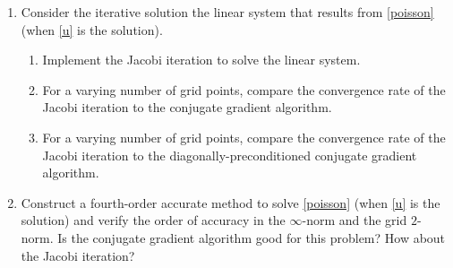\documentclass[10pt]{amsart}
\begin{document}
\begin{enumerate}[label={\bf Problem~{\arabic*}:}]
  \mline 
  \item Consider the iterative solution the linear system that results
    from \eqref{poisson} (when \eqref{u} is the solution).
    \begin{enumerate}
    \item Implement the Jacobi iteration to solve the linear system.
    \item For a varying number of grid points, compare the convergence rate of the Jacobi iteration to the
      conjugate gradient algorithm.
      \item For a varying number of grid points, compare the convergence rate of the Jacobi iteration to
        the diagonally-preconditioned conjugate gradient algorithm.
    \end{enumerate}

    \mline
    \item Construct a fourth-order accurate method to solve \eqref{poisson}
      (when \eqref{u} is the solution) and verify the order of
      accuracy in the $\infty$-norm and the grid $2$-norm.  Is the conjugate gradient algorithm good for this
      problem?  How about the Jacobi iteration?
    
    \end{enumerate}

    
\end{document}
